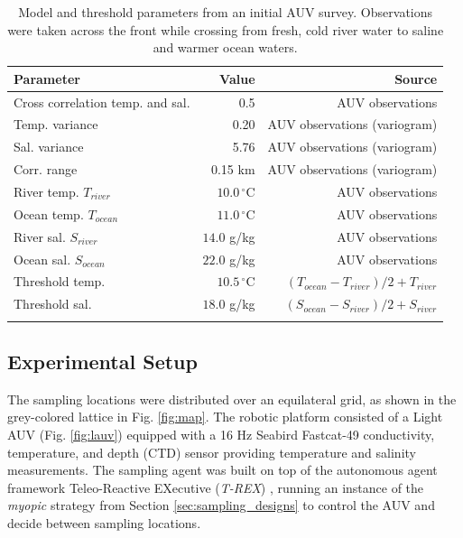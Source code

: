 \documentclass[aoas]{imsart}
\begin{document}
\begin{table}[!h]
\centering
\begin{tabular}{lrr}
\toprule
Parameter & Value & Source\\
\midrule
\rowcolor{Gray}
Cross correlation temp. and sal. & 0.5 & AUV observations\\
Temp. variance &  0.20 & AUV observations (variogram)\\
\rowcolor{Gray}
Sal. variance &  5.76 & AUV observations (variogram)\\
Corr. range  & 0.15 km & AUV observations (variogram)\\
\rowcolor{Gray}
River temp. $T_{river}$ & $10.0\,^{\circ}\mathrm{C}$ & AUV observations\\
Ocean temp. $T_{ocean}$ & $11.0\,^{\circ}\mathrm{C}$ & AUV observations\\
\rowcolor{Gray}
River sal. $S_{river}$ & $14.0$ g/kg & AUV observations\\
Ocean sal. $S_{ocean}$ & $22.0$ g/kg & AUV observations\\
\rowcolor{Gray}
Threshold temp. & $10.5\,^{\circ}\mathrm{C}$ & $(T_{ocean}-T_{river})/2+T_{river}$\\
Threshold sal. & $18.0$ g/kg & $(S_{ocean}-S_{river})/2+S_{river}$\\
\rowcolor{Gray}
\bottomrule
\end{tabular}
\caption{Model and threshold parameters from an initial AUV
  survey. Observations were taken across the front while crossing from
  fresh, cold river water to saline and warmer ocean waters.}
\label{tab:experiment_param}
\end{table}


\subsection{Experimental Setup}

The sampling locations were distributed over an equilateral grid, as shown in the grey-colored lattice in Fig. \ref{fig:map}. The robotic platform consisted of a Light AUV \citep{sousa2012lauv} (Fig. \ref{fig:lauv}) equipped with a 16 Hz Seabird Fastcat-49 conductivity, temperature, and depth (CTD) sensor providing temperature and salinity measurements. %
The sampling agent was built on top of the autonomous agent framework Teleo-Reactive EXecutive (\textit{T-REX}) \citep{py10,Rajan12,Rajan12b}, running an instance of the \textit{myopic} strategy from Section \ref{sec:sampling_designs} to control the AUV and decide between sampling locations.
\end{document}
